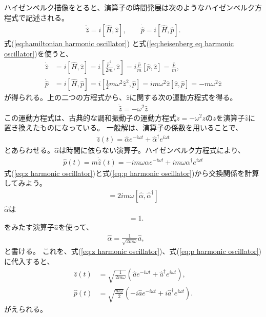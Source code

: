 \documentclass[10pt,a4paper]{jarticle}
\begin{document}
ハイゼンベルク描像をとると、演算子の時間発展は次のようなハイゼンベルク方程式で記述される。
\begin{align}
\dot {\hat z} = i[\hat H, \hat z], \qquad
\dot {\hat p} = i[\hat H, \hat p]. \label{eq:heisenberg eq harmonic oscillator}
\end{align}
式(\ref{eq:hamiltonian harmonic oscillator})
と式(\ref{eq:heisenberg eq harmonic oscillator})を使うと、
\begin{align}
\dot {\hat z} &= i[\hat H, \hat z] = i[\frac{\hat p^2}{2m}, \hat z] = i\frac{\hat p}{m} [\hat p,\hat z] = \frac{\hat p}{m}, \\
\dot {\hat p} &= i[\hat H, \hat p] = i[\frac{1}{2}m\omega^2 \hat z^2, \hat p] = i m \omega^2 \hat z [\hat z,\hat p] = -m\omega^2 \hat z
\end{align}
が得られる。上の二つの方程式から、$\hat z$に関する次の運動方程式を得る。
\begin{align}
\ddot{\hat z} = -\omega^2 \hat z
\end{align}
この運動方程式は、古典的な調和振動子の運動方程式$\ddot z = -\omega^2 z$の$z$を演算子$\hat z$に置き換えたものになっている。
一般解は、演算子の係数を用いることで、
\begin{align}
\hat z(t) = \hat\alpha e^{-i\omega t} + \hat\alpha^\dagger e^{i\omega t} \label{eq:z harmonic oscillator}
\end{align}
とあらわせる。$\hat\alpha$は時間に依らない演算子。ハイゼンベルク方程式により、
\begin{align}
\hat p(t) = m \dot{\hat z}(t) = -im\omega \alpha e^{-i\omega t} + im\omega \label{eq:p harmonic oscillator} \alpha^\dagger e^{i\omega t}
\end{align}
%
式(\ref{eq:z harmonic oscillator})と式(\ref{eq:p harmonic oscillator})から交換関係を計算してみよう。
\begin{align}
[\hat z(t), \hat p(t)] = 2im\omega [\hat\alpha, \hat\alpha^\dagger]
\end{align}
%
$\hat\alpha$は
\begin{align}
[\hat a, \hat a^\dagger] &= 1.
\end{align}
をみたす演算子$\hat a$を使って、
\begin{align}
\hat\alpha = \frac{1}{ \sqrt{2m\omega} }\hat a, \qquad
\end{align}
と書ける。
これを、式(\ref{eq:z harmonic oscillator})、式(\ref{eq:p harmonic oscillator})に代入すると、
\begin{align}
\hat z(t) &= \sqrt{\frac{1}{2m\omega}} \left( \hat a e^{-i\omega t} + \hat a^\dagger e^{i\omega t}  \right), \\
\hat p(t) &= \sqrt{\frac{m\omega}{2}} \left( -i\hat a e^{-i\omega t} + i\hat a^\dagger e^{i\omega t}  \right).
\end{align}
がえられる。
\end{document}
